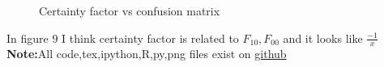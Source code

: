 \documentclass{article}
\begin{document}
\begin{landscape}
\begin{figure}[H]
	\caption{Certainty factor vs confusion matrix}
\end{figure}
\flushleft
In figure 9 I think certainty factor is related to \(F_{10},F_{00}\) and it looks like \(\frac{-1}{x}\)\\
\textbf{Note:}All code,tex,ipython,R,py,png files exist on \href{https://github.com/aqeel13932/DM/tree/master/HW06}{github}\\
\end{landscape}
\end{document}
